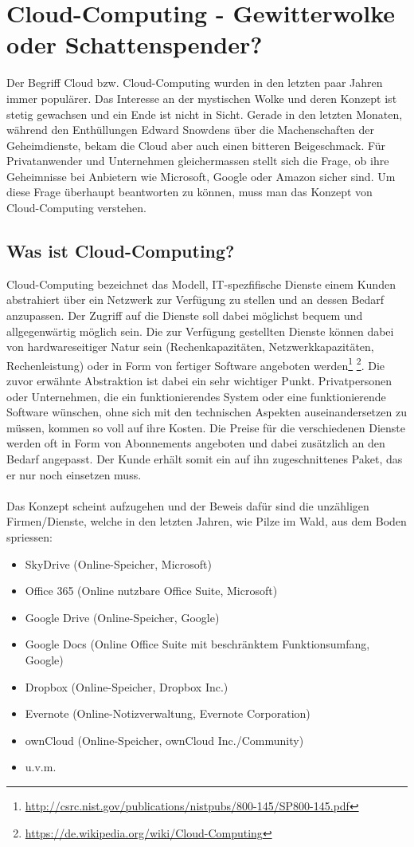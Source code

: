 \newpage
\section{Cloud-Computing - Gewitterwolke oder Schattenspender?}
Der Begriff Cloud bzw. Cloud-Computing wurden in den letzten paar Jahren immer populärer. Das Interesse an der mystischen Wolke und deren Konzept ist stetig gewachsen und ein Ende ist nicht in Sicht. Gerade in den letzten Monaten, während den Enthüllungen Edward Snowdens über die Machenschaften der Geheimdienste, bekam die Cloud aber auch einen bitteren Beigeschmack. Für Privatanwender und Unternehmen gleichermassen stellt sich die Frage, ob ihre Geheimnisse bei Anbietern wie Microsoft, Google oder Amazon sicher sind. Um diese Frage überhaupt beantworten zu können, muss man das Konzept von Cloud-Computing verstehen.

\subsection{Was ist Cloud-Computing?}
Cloud-Computing bezeichnet das Modell, IT-spezfifische Dienste einem Kunden abstrahiert über ein Netzwerk zur Verfügung zu stellen und an dessen Bedarf anzupassen. Der Zugriff auf die Dienste soll dabei möglichst bequem und allgegenwärtig möglich sein. Die zur Verfügung gestellten Dienste können dabei von hardwareseitiger Natur sein (Rechenkapazitäten, Netzwerkkapazitäten, Rechenleistung) oder in Form von fertiger Software angeboten werden\footnote{\url{http://csrc.nist.gov/publications/nistpubs/800-145/SP800-145.pdf}} \footnote{\url{https://de.wikipedia.org/wiki/Cloud-Computing}}.
Die zuvor erwähnte Abstraktion ist dabei ein sehr wichtiger Punkt. Privatpersonen oder Unternehmen, die ein funktionierendes System oder eine funktionierende Software wünschen, ohne sich mit den technischen Aspekten auseinandersetzen zu müssen, kommen so voll auf ihre Kosten. Die Preise für die verschiedenen Dienste werden oft in Form von Abonnements angeboten und dabei zusätzlich an den Bedarf angepasst. Der Kunde erhält somit ein auf ihn zugeschnittenes Paket, das er nur noch einsetzen muss.
\\
\\
Das Konzept scheint aufzugehen und der Beweis dafür sind die unzähligen Firmen/Dienste, welche in den letzten Jahren, wie Pilze im Wald, aus dem Boden spriessen:
\begin{itemize}
\item SkyDrive (Online-Speicher, Microsoft)
\item Office 365 (Online nutzbare Office Suite, Microsoft)
\item Google Drive (Online-Speicher, Google) 
\item Google Docs (Online Office Suite mit beschränktem Funktionsumfang, Google)
\item Dropbox (Online-Speicher, Dropbox Inc.)
\item Evernote (Online-Notizverwaltung, Evernote Corporation)
\item ownCloud (Online-Speicher, ownCloud Inc./Community)
\item u.v.m.
\end{itemize}


